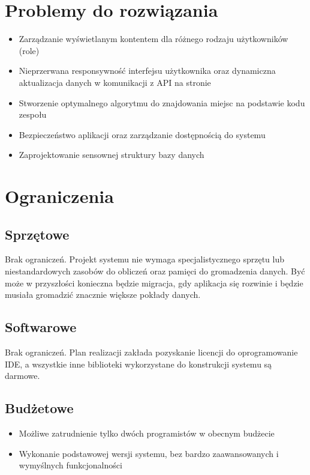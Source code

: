 \documentclass{article}
\begin{document}
\section{Problemy do rozwiązania}
\begin{itemize}
  \item Zarządzanie wyświetlanym kontentem dla różnego rodzaju użytkowników (role) 
  \item Nieprzerwana responsywność interfejsu użytkownika oraz dynamiczna aktualizacja danych w komunikacji z API na stronie
  \item Stworzenie optymalnego algorytmu do znajdowania miejsc na podstawie kodu zespołu
  \item Bezpieczeństwo aplikacji oraz zarządzanie dostępnością do systemu
  \item Zaprojektowanie sensownej struktury bazy danych
\end{itemize}


\section{Ograniczenia}

\subsection{Sprzętowe}
Brak ograniczeń. Projekt systemu nie wymaga specjalistycznego sprzętu lub niestandardowych zasobów do obliczeń oraz pamięci do gromadzenia danych. Być może w przyszłości konieczna będzie migracja, gdy aplikacja się rozwinie i będzie musiała gromadzić znacznie większe pokłady danych.

\subsection{Softwarowe}
Brak ograniczeń. Plan realizacji zakłada pozyskanie licencji do oprogramowanie IDE, a wszystkie inne biblioteki wykorzystane do konstrukcji systemu są darmowe.

\subsection{Budżetowe}
\begin{itemize}
  \item Możliwe zatrudnienie tylko dwóch programistów w obecnym budżecie
  \item Wykonanie podstawowej wersji systemu, bez bardzo zaawansowanych i wymyślnych funkcjonalności
\end{itemize}
\end{document}
